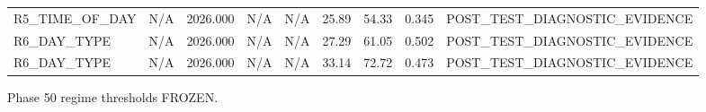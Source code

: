 \begin{table}[h!]
\begin{tabular}{lrrrrrrrr}
R5\_TIME\_OF\_DAY & N/A & 2026.000 & N/A & N/A & 25.89 & 54.33 & 0.345 & POST\_TEST\_DIAGNOSTIC\_EVIDENCE \\
R6\_DAY\_TYPE & N/A & 2026.000 & N/A & N/A & 27.29 & 61.05 & 0.502 & POST\_TEST\_DIAGNOSTIC\_EVIDENCE \\
R6\_DAY\_TYPE & N/A & 2026.000 & N/A & N/A & 33.14 & 72.72 & 0.473 & POST\_TEST\_DIAGNOSTIC\_EVIDENCE \\
\bottomrule
\end{tabular}
\vspace{4pt}
\footnotesize{Phase 50 regime thresholds FROZEN.}\\
\end{table}
